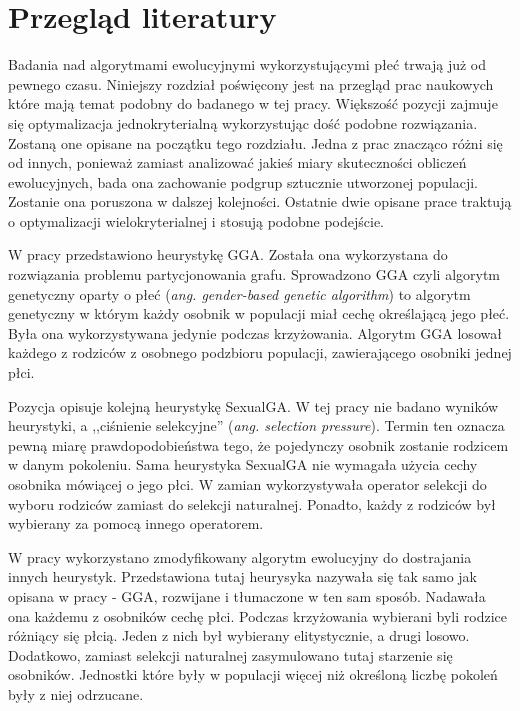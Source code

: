 \documentclass[./FM_mgr.tex]{subfiles}
\begin{document}
\chapter{Przegląd literatury} \label{chapter:literature}

Badania nad algorytmami ewolucyjnymi wykorzystującymi płeć trwają już od pewnego czasu.
Niniejszy rozdział poświęcony jest na przegląd prac naukowych które mają temat podobny do badanego w tej pracy.
Większość pozycji zajmuje się optymalizacja jednokryterialną wykorzystując dość podobne rozwiązania.
Zostaną one opisane na początku tego rozdziału.
Jedna z prac znacząco różni się od innych, ponieważ zamiast analizować jakieś miary skuteczności obliczeń ewolucyjnych, bada ona zachowanie podgrup sztucznie utworzonej populacji.
Zostanie ona poruszona w dalszej kolejności.
Ostatnie dwie opisane prace traktują o optymalizacji wielokryterialnej i stosują podobne podejście.


W pracy \cite{GGA} przedstawiono heurystykę GGA.
Została ona wykorzystana do rozwiązania problemu partycjonowania grafu.
Sprowadzono 
GGA czyli algorytm genetyczny oparty o płeć (\emph{ang. gender-based genetic algorithm}) to algorytm genetyczny w którym każdy osobnik w populacji miał cechę określającą jego płeć.
Była ona wykorzystywana jedynie podczas krzyżowania.
Algorytm GGA losował każdego z rodziców z osobnego podzbioru populacji, zawierającego osobniki jednej płci.

Pozycja \cite{SexualGA} opisuje kolejną heurystykę SexualGA.
W tej pracy nie badano wyników heurystyki, a ,,ciśnienie selekcyjne'' (\emph{ang. selection pressure}).
Termin ten oznacza pewną miarę prawdopodobieństwa tego, że pojedynczy osobnik zostanie rodzicem w danym pokoleniu.
Sama heurystyka SexualGA nie wymagała użycia cechy osobnika mówiącej o jego płci.
W zamian wykorzystywała operator selekcji do wyboru rodziców zamiast do selekcji naturalnej.
Ponadto, każdy z rodziców był wybierany za pomocą innego operatorem.

W pracy \cite{ansotegui} wykorzystano zmodyfikowany algorytm ewolucyjny do dostrajania innych heurystyk.
Przedstawiona tutaj heurysyka nazywała się tak samo jak opisana w pracy \cite{GGA} - GGA, rozwijane i tłumaczone w ten sam sposób.
Nadawała ona każdemu z osobników cechę płci.
Podczas krzyżowania wybierani byli rodzice różniący się płcią.
Jeden z nich był wybierany elitystycznie, a drugi losowo.
Dodatkowo, zamiast selekcji naturalnej zasymulowano tutaj starzenie się osobników.
Jednostki które były w populacji więcej niż określoną liczbę pokoleń były z niej odrzucane.
\end{document}
